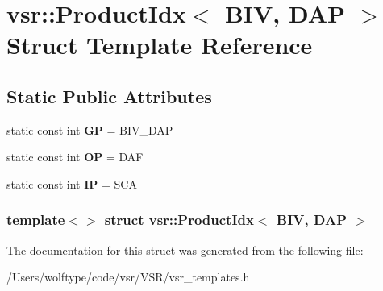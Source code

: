 \hypertarget{structvsr_1_1_product_idx_3_01_b_i_v_00_01_d_a_p_01_4}{\section{vsr\-:\-:Product\-Idx$<$ B\-I\-V, D\-A\-P $>$ Struct Template Reference}
\label{structvsr_1_1_product_idx_3_01_b_i_v_00_01_d_a_p_01_4}
}
\subsection*{Static Public Attributes}
\begin{DoxyCompactItemize}
\item 
\hypertarget{structvsr_1_1_product_idx_3_01_b_i_v_00_01_d_a_p_01_4_a2be133a3fff662ac8973dee8520f6a6e}{static const int {\bfseries G\-P} = B\-I\-V\-\_\-\-D\-A\-P}\label{structvsr_1_1_product_idx_3_01_b_i_v_00_01_d_a_p_01_4_a2be133a3fff662ac8973dee8520f6a6e}

\item 
\hypertarget{structvsr_1_1_product_idx_3_01_b_i_v_00_01_d_a_p_01_4_aa729a2fe9f92637411e4503f6c874652}{static const int {\bfseries O\-P} = D\-A\-F}\label{structvsr_1_1_product_idx_3_01_b_i_v_00_01_d_a_p_01_4_aa729a2fe9f92637411e4503f6c874652}

\item 
\hypertarget{structvsr_1_1_product_idx_3_01_b_i_v_00_01_d_a_p_01_4_ae847c248c78e7f417a7f76cf1922e289}{static const int {\bfseries I\-P} = S\-C\-A}\label{structvsr_1_1_product_idx_3_01_b_i_v_00_01_d_a_p_01_4_ae847c248c78e7f417a7f76cf1922e289}

\end{DoxyCompactItemize}
\subsubsection*{template$<$$>$ struct vsr\-::\-Product\-Idx$<$ B\-I\-V, D\-A\-P $>$}



The documentation for this struct was generated from the following file\-:\begin{DoxyCompactItemize}
\item 
/\-Users/wolftype/code/vsr/\-V\-S\-R/vsr\-\_\-templates.\-h\end{DoxyCompactItemize}

